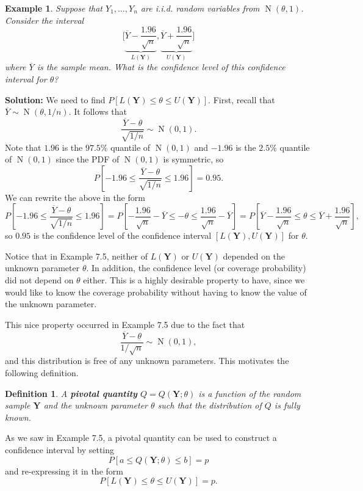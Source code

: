 \documentclass[10pt]{article}
\DeclareMathOperator{\Nor}{N}
\theoremstyle{newstyle}
\newtheorem{defn}[thm]{Definition}
\newtheorem{exmp}[thm]{Example}
\begin{document}
\begin{exmp}
Suppose that $Y_1, \dots, Y_n$ are i.i.d. random variables from $\Nor(\theta, 1)$. 
Consider the interval 
\[ \Bigg[\underbrace{\overline Y - \frac{1.96}{\sqrt n}}_{L(\mathbf Y)}, \underbrace{\overline Y + \frac{1.96}{\sqrt n}}_{U(\mathbf Y)} \Bigg] \]
where $\overline Y$ is the sample mean. What is the confidence level of this confidence 
interval for $\theta$?
\end{exmp}
{\color{blue} 
{\bf Solution:} 
We need to find $P[L(\mathbf Y) \leq \theta \leq U(\mathbf Y)]$. 
First, recall that $\overline Y \sim \Nor(\theta, 1/n)$. It follows that 
\[ \frac{\overline Y - \theta}{\sqrt{1/n}} \sim \Nor(0, 1). \]
Note that $1.96$ is the $97.5\%$ quantile of $\Nor(0, 1)$ and $-1.96$ is the $2.5\%$ 
quantile of $\Nor(0, 1)$ since the PDF of $\Nor(0, 1)$ is symmetric, so
\[ P \left[ -1.96 \leq \frac{\overline Y - \theta}{\sqrt{1/n}} \leq 1.96 \right] = 0.95. \]
We can rewrite the above in the form 
\[ P \left[ -1.96 \leq \frac{\overline Y - \theta}{\sqrt{1/n}} \leq 1.96 \right] 
= P \left[ -\frac{1.96}{\sqrt n} - \overline Y \leq -\theta \leq 
\frac{1.96}{\sqrt n} - \overline Y \right] = 
P\left[ \overline Y - \frac{1.96}{\sqrt n} \leq \theta \leq \overline Y + \frac{1.96}{\sqrt n} \right], \]
so $0.95$ is the confidence level of the confidence interval $[L(\mathbf Y), U(\mathbf Y)]$ 
for $\theta$. 
}

Notice that in Example 7.5, neither of $L(\mathbf Y)$ or $U(\mathbf Y)$ depended on the 
unknown parameter $\theta$. In addition, the confidence level (or coverage probability) 
did not depend on $\theta$ either. This is a highly desirable property to have, since we would like to know the coverage probability without having to know the value of the unknown parameter. 

This nice property occurred in Example 7.5 due to the fact that 
\[ \frac{\overline Y - \theta}{1/\sqrt n} \sim \Nor(0, 1), \]
and this distribution is free of any unknown parameters. This motivates the following definition. 

\begin{defn}
A {\bf pivotal quantity} $Q = Q(\mathbf Y; \theta)$ is a function of the random sample 
$\mathbf Y$ and the unknown parameter $\theta$ such that the distribution of $Q$ is 
fully known. 
\end{defn}

As we saw in Example 7.5, a pivotal quantity can be used to construct a confidence interval 
by setting 
\[ P[a \leq Q(\mathbf Y; \theta) \leq b] = p \]
and re-expressing it in the form 
\[ P[L(\mathbf Y) \leq \theta \leq U(\mathbf Y)] = p. \]
\end{document}
